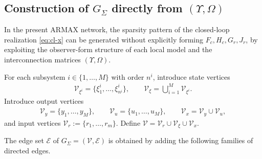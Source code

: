 \documentclass[11pt,a4paper]{article}
\begin{document}
\subsection{Construction of $G_\Sigma$ directly from $(\Upsilon,\Omega)$}

In the present ARMAX network, the sparsity pattern of the closed-loop realization \eqref{eq:cl-x} can be generated without explicitly forming $F_c,H_c,G_r,J_r$, by exploiting the observer-form structure of each local model and the interconnection matrices $(\Upsilon,\Omega)$.

For each subsystem $i\in\{1,\dots,M\}$ with order $n^i$, introduce state vertices
\begin{align*}
    \mathcal V_{\xi^i} = \{\xi^i_1,\dots,\xi^i_{n^i}\}, \qquad \mathcal V_\xi = \bigcup_{i=1}^M \mathcal V_{\xi^i}.
\end{align*}
Introduce output vertices
\begin{align*}
    \mathcal V_y = \{y_1,\dots,y_M\},\qquad
    \mathcal V_u = \{u_1,\dots,u_M\},\qquad
    \mathcal V_x = \mathcal V_y \cup \mathcal V_u,
\end{align*}
and input vertices $\mathcal V_r:=\{r_1,\dots,r_m\}$. Define $\mathcal V = \mathcal V_r \cup \mathcal V_\xi \cup \mathcal V_x$.


The edge set $\mathcal E$ of $G_\Sigma=(\mathcal V,\mathcal E)$ is obtained by adding the following families of directed edges.
\end{document}
